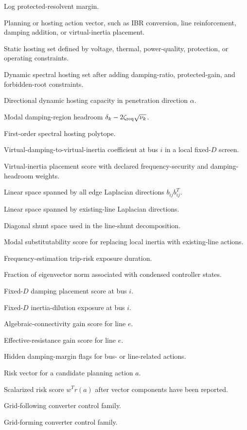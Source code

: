 \begin{description}[leftmargin=3.2cm,style=nextline]
\item[\(S_g\)] Log protected-resolvent margin.
\item[\(\rho\)] Planning or hosting action vector, such as IBR conversion,
line reinforcement, damping addition, or virtual-inertia placement.
\item[\(\mathcal H_{\rm stat}\)] Static hosting set defined by voltage,
thermal, power-quality, protection, or operating constraints.
\item[\(\mathcal H_{\rm dyn}\)] Dynamic spectral hosting set after adding
damping-ratio, protected-gain, and forbidden-root constraints.
\item[\(h_{\rm dyn}(\alpha)\)] Directional dynamic hosting capacity in
penetration direction \(\alpha\).
\item[\(h_k\)] Modal damping-region headroom
\(\delta_k-2\zeta_{\rm req}\sqrt{\nu_k}\).
\item[\(\mathcal P_{\rm host}^{(1)}\)] First-order spectral hosting polytope.
\item[\(\gamma_i^v\)] Virtual-damping-to-virtual-inertia coefficient at bus
\(i\) in a local fixed-\(D\) screen.
\item[\(J_i^{\rm VI}\)] Virtual-inertia placement score with declared
frequency-security and damping-headroom weights.
\item[\(\mathcal L_{\rm all}\)] Linear space spanned by all edge Laplacian
directions \(b_{ij}b_{ij}^T\).
\item[\(\mathcal L_{\rm ex}\)] Linear space spanned by existing-line Laplacian
directions.
\item[\(\mathcal D_{\rm sh}\)] Diagonal shunt space used in the line-shunt
decomposition.
\item[\(s_i\)] Modal substitutability score for replacing local inertia with
existing-line actions.
\item[\(T_{\rm risk}\)] Frequency-estimation trip-risk exposure duration.
\item[\(\pi_c\)] Fraction of eigenvector norm associated with condensed
controller states.
\item[\(\mathcal D_i\)] Fixed-\(D\) damping placement score at bus \(i\).
\item[\(\mathcal M_i\)] Fixed-\(D\) inertia-dilution exposure at bus \(i\).
\item[\(G_e^{(2)}\)] Algebraic-connectivity gain score for line \(e\).
\item[\(G_e^{(K)}\)] Effective-resistance gain score for line \(e\).
\item[\(H_i,H_e\)] Hidden damping-margin flags for bus- or line-related actions.
\item[\(r(a)\)] Risk vector for a candidate planning action \(a\).
\item[\(\mathcal R(a)\)] Scalarized risk score \(w^Tr(a)\) after vector
components have been reported.
\item[\texttt{GFL}] Grid-following converter control family.
\item[\texttt{GFM}] Grid-forming converter control family.
\end{description}
